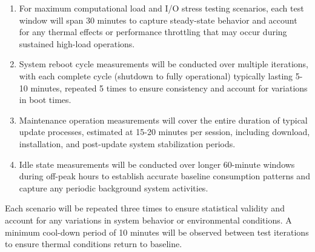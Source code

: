 \begin{enumerate}[label=TW\arabic*]
    \item For maximum computational load and I/O stress testing scenarios, each
    test window will span 30 minutes to capture steady-state behavior and account
    for any thermal effects or performance throttling that may occur during
    sustained high-load operations.

    \item System reboot cycle measurements will be conducted over multiple
    iterations, with each complete cycle (shutdown to fully operational)
    typically lasting 5-10 minutes, repeated 5 times to ensure consistency and
    account for variations in boot times.

    \item Maintenance operation measurements will cover the entire duration of
    typical update processes, estimated at 15-20 minutes per session, including
    download, installation, and post-update system stabilization periods.

    \item Idle state measurements will be conducted over longer 60-minute windows
    during off-peak hours to establish accurate baseline consumption patterns and
    capture any periodic background system activities.
\end{enumerate}

Each scenario will be repeated three times to ensure statistical validity and
account for any variations in system behavior or environmental conditions. A
minimum cool-down period of 10 minutes will be observed between test iterations
to ensure thermal conditions return to baseline.


